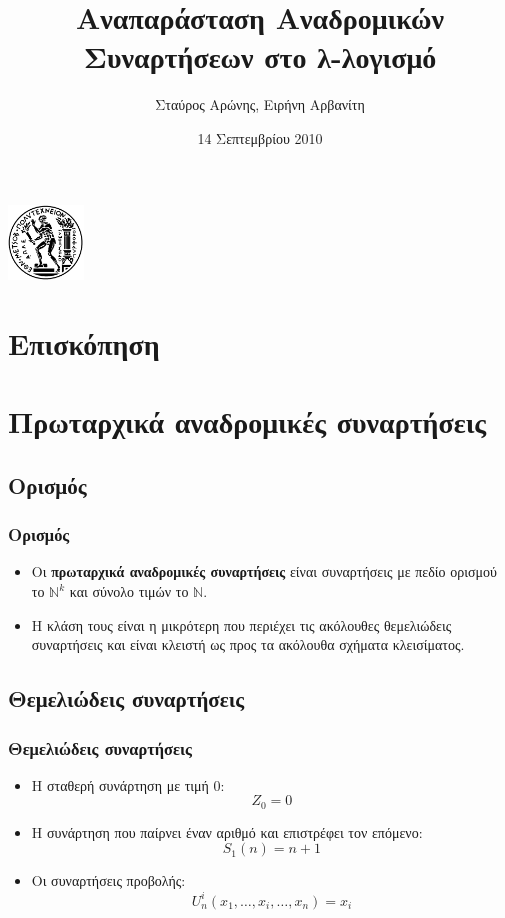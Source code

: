 \documentclass{beamer}
\title[Αναδρομικές Συναρτήσεις στο λ-λογισμό]{Αναπαράσταση Αναδρομικών Συναρτήσεων στο λ-λογισμό}
\author{Σταύρος Αρώνης, Ειρήνη Αρβανίτη}
\date{14 Σεπτεμβρίου 2010}
\institute{Εφαρμογές της λογικής στην Πληροφορική\\Σχολή ΗΜΜΥ, ΕΜΠ}
\begin{document}
\begin{frame}
        \titlepage
        \begin{center}
                \includegraphics[height=2cm]{pyrforos.png}
        \end{center}
\end{frame}

\section*{Επισκόπηση}

\begin{frame}
  \tableofcontents[hidesubsections]
\end{frame}

\section{Πρωταρχικά αναδρομικές συναρτήσεις}

\subsection{Ορισμός}

\begin{frame}
        \frametitle{Ορισμός}
        \begin{itemize}
                \item   Οι \textbf{πρωταρχικά αναδρομικές συναρτήσεις} 
                                είναι συναρτήσεις με πεδίο ορισμού το $\mathbb{N}^k$ 
                                και σύνολο τιμών το $\mathbb{N}$.
                \pause
                \item   Η κλάση τους είναι η μικρότερη που περιέχει τις ακόλουθες
                                θεμελιώδεις συναρτήσεις και είναι κλειστή ως προς τα ακόλουθα
                                σχήματα κλεισίματος.
        \end{itemize}
\end{frame}

\subsection{Θεμελιώδεις συναρτήσεις}

\begin{frame}
        \frametitle{Θεμελιώδεις συναρτήσεις}
        \begin{itemize}
                \item Η σταθερή συνάρτηση με τιμή 0: $$Z_0=0$$
                \pause
                \item Η συνάρτηση που παίρνει έναν αριθμό και επιστρέφει τον επόμενο: $$S_1(n)=n+1$$
                \pause
                \item Οι συναρτήσεις προβολής: $$U^i_n(x_1,\ldots,x_i,\ldots,x_n)=x_i$$
        \end{itemize}
\end{frame}
\end{document}
